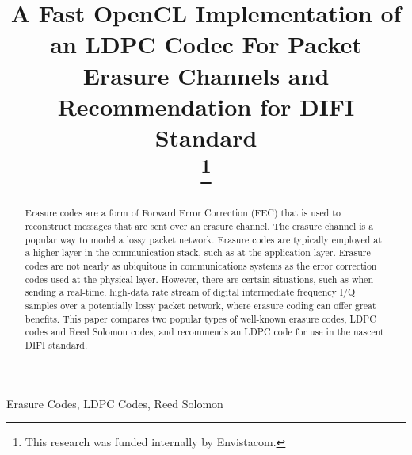 \documentclass[conference]{IEEEtran}
\begin{document}
\title{A Fast OpenCL Implementation of an LDPC Codec For Packet Erasure Channels and Recommendation for DIFI Standard\\
\thanks{This research was funded internally by Envistacom.}
}

\author{
 }

\maketitle

\begin{abstract}
Erasure codes are a form of Forward Error Correction (FEC) that is used to reconstruct messages that are sent over an erasure channel.  The erasure channel is a popular way to model a lossy packet network.  Erasure codes are typically employed at a higher layer in the communication stack, such as at the application layer.  Erasure codes are not nearly as ubiquitous in communications systems as the error correction codes used at the physical layer.  However, there are certain situations, such as when sending a real-time, high-data rate stream of digital intermediate frequency I/Q samples over a potentially lossy packet network, where erasure coding can offer great benefits.  This paper compares two popular types of well-known erasure codes, LDPC codes and Reed Solomon codes, and recommends an LDPC code for use in the nascent DIFI \cite{DIFI2021IEEEStd4900-2021} standard.
\end{abstract}

\begin{IEEEkeywords}
Erasure Codes, LDPC Codes, Reed Solomon
\end{IEEEkeywords}
\end{document}
